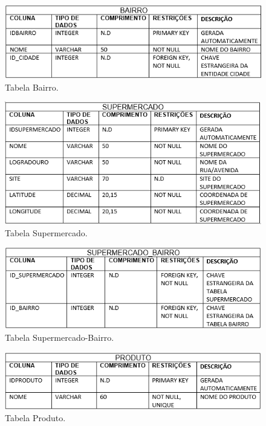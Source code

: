 \begin{figure}[H]
    \centering
    \caption{Tabela Bairro.}
   	\includegraphics[scale=0.64]{Imagens/TabelaBairro.PNG}
\end{figure}
			
\begin{figure}[H]
	\centering
    \caption{Tabela Supermercado.}
    \includegraphics[scale=0.64]{Imagens/TabelaSupermercado.PNG}
\end{figure}
			
\begin{figure}[H]
    \centering
    \caption{Tabela Supermercado-Bairro.}
    \includegraphics[scale=0.64]{Imagens/TabelaSupermercadoBairro.PNG}
\end{figure}
			
\begin{figure}[H]
    \centering
    \caption{Tabela Produto.}
    \includegraphics[scale=0.64]{Imagens/TabelaProduto.PNG}
\end{figure}
			
